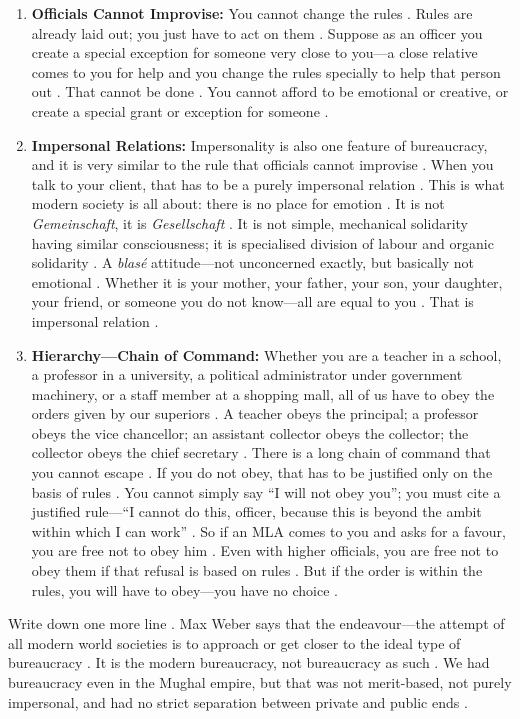 \begin{enumerate}
    \item \textbf{Officials Cannot Improvise:} You cannot change the rules . Rules are already laid out; you just have to act on them . Suppose as an officer you create a special exception for someone very close to you---a close relative comes to you for help and you change the rules specially to help that person out . That cannot be done . You cannot afford to be emotional or creative, or create a special grant or exception for someone .

    \item \textbf{Impersonal Relations:} Impersonality is also one feature of bureaucracy, and it is very similar to the rule that officials cannot improvise . When you talk to your client, that has to be a purely impersonal relation . This is what modern society is all about: there is no place for emotion . It is not \textit{Gemeinschaft}, it is \textit{Gesellschaft} . It is not simple, mechanical solidarity having similar consciousness; it is specialised division of labour and organic solidarity . A \textit{blasé} attitude---not unconcerned exactly, but basically not emotional . Whether it is your mother, your father, your son, your daughter, your friend, or someone you do not know---all are equal to you . That is impersonal relation .

    \item \textbf{Hierarchy---Chain of Command:} Whether you are a teacher in a school, a professor in a university, a political administrator under government machinery, or a staff member at a shopping mall, all of us have to obey the orders given by our superiors . A teacher obeys the principal; a professor obeys the vice chancellor; an assistant collector obeys the collector; the collector obeys the chief secretary . There is a long chain of command that you cannot escape .
    If you do not obey, that has to be justified only on the basis of rules . You cannot simply say ``I will not obey you''; you must cite a justified rule---``I cannot do this, officer, because this is beyond the ambit within which I can work'' . So if an MLA comes to you and asks for a favour, you are free not to obey him . Even with higher officials, you are free not to obey them if that refusal is based on rules . But if the order is within the rules, you will have to obey---you have no choice .
\end{enumerate}

\begin{KeyConcept}
Write down one more line . Max Weber says that the endeavour---the attempt of all modern world societies is to approach or get closer to the ideal type of bureaucracy .
It is the modern bureaucracy, not bureaucracy as such . We had bureaucracy even in the Mughal empire, but that was not merit-based, not purely impersonal, and had no strict separation between private and public ends .
\end{KeyConcept}

